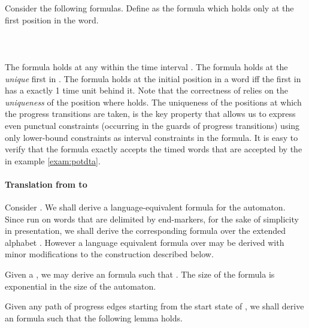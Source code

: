 \documentclass{llncs}
\newcommand{\potdta}{\mbox{}}
\newcommand{\mitlfpinf}{\mbox{}}
\begin{document}
Consider the following \mitlfpinf\/ formulas. Define  as the formula which holds only at the first position in the word.\\
\hspace*{1cm}
\\
\hspace*{1cm}
\\
\hspace*{1cm}
 \\
The formula  holds at any  within the time interval . The formula  holds at the \textit{unique} first  in . The formula  holds at the initial position in a word iff the first  in  has a  exactly 1 time unit behind it. Note that the correctness of  relies on the \emph{uniqueness} of the position where  holds. The uniqueness of the positions at which the progress transitions are taken, is the key property that allows us to express even punctual constraints (occurring in the guards of progress transitions) using only lower-bound constraints as interval constraints in the formula. It is easy to verify that the \mitlfpinf\/ formula  exactly accepts the timed words that are accepted by the \potdta\/ in example \ref{exam:potdta}.

\paragraph{Translation from \potdta\/ to \mitlfpinf\\}
Consider  \potdta\/ . We shall derive a language-equivalent \mitlfpinf\/ formula  for the automaton. Since \potdta\/ run on words that are delimited by end-markers, for the sake of simplicity in presentation, we shall derive the corresponding \mitlfpinf\/ formula over the extended alphabet . However a language equivalent formula over  may be derived with minor modifications to the construction described below.

\begin{theorem}
Given a \potdta\/ , we may derive an \mitlfpinf\/ formula  such that . The size of the formula is exponential in the size of the automaton.
\end{theorem}

Given any path  of progress edges starting from the start state  of , we shall derive an \mitlfpinf\/ formula  such that the following lemma holds.
\end{document}
